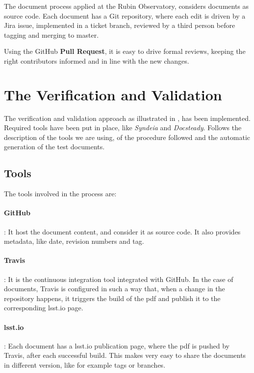 The document process applied at the Rubin Observatory, considers documents as source code.
Each document has a Git repository, where each edit is driven by a Jira issue, implemented in a ticket branch, 
reviewed by a third person before tagging and merging to master.

Using the GitHub \textbf{Pull Request}, it is easy to drive formal reviews, keeping the right contributors informed and in line with the new changes.


\section{The Verification and Validation}

The verification and validation approach as illustrated in \cite{10.1117/12.2310125} , has been implemented.
Required tools have been put in place, like \textit{Syndeia} and \textit{Docsteady}.
Follows the description of the tools we are using, of the procedure followed and the automatic generation of the test documents.


\subsection{Tools}

The tools involved in the process are:

\paragraph{GitHub}:
It host the document content, and consider it as source code. It also provides metadata, like date, revision numbers and tag.

\paragraph{Travis}:
It is the continuous integration tool integrated with GitHub.
In the case of documents, Travis is configured in such a way that, when a change in the repository happens, 
it triggers the build of the pdf and publish it to the corresponding lsst.io page.

\paragraph{lsst.io}:
Each document has a lsst.io publication page, where the pdf is pushed by Travis, after each successful build.
This makes very easy to share the documents in different version, like for example tags or branches.

